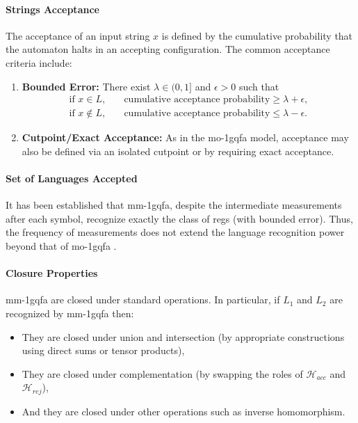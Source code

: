 \paragraph{Strings Acceptance}  
The acceptance of an input string $x$ is defined by the cumulative probability that the automaton halts in an accepting configuration. The common acceptance criteria include:
\begin{enumerate}
  \item \textbf{Bounded Error:} There exist $\lambda\in(0,1]$ and $\epsilon>0$ such that
  \[
  \begin{aligned}
  \text{if } x\in L,&\quad \text{cumulative acceptance probability} \ge \lambda+\epsilon,\\[1mm]
  \text{if } x\notin L,&\quad \text{cumulative acceptance probability} \le \lambda-\epsilon.
  \end{aligned}
  \]
  \item \textbf{Cutpoint/Exact Acceptance:} As in the \gls{mo-1gqfa} model, acceptance may also be defined via an isolated cutpoint or by requiring exact acceptance.
\end{enumerate}

\paragraph{Set of Languages Accepted} 
It has been established that \gls{mm-1gqfa}, despite the intermediate measurements after each symbol, recognize exactly the class of \glspl{reg} (with bounded error). Thus, the frequency of measurements does not extend the language recognition power beyond that of \gls{mo-1gqfa} \cite{li2012characterizations}.

\paragraph{Closure Properties}  
\gls{mm-1gqfa} are closed under standard operations. In particular, if $L_1$ and $L_2$ are recognized by \gls{mm-1gqfa} then:
\begin{itemize}
  \item They are closed under union and intersection (by appropriate constructions using direct sums or tensor products),
  \item They are closed under complementation (by swapping the roles of $\mathcal{H}_{acc}$ and $\mathcal{H}_{rej}$),
  \item And they are closed under other operations such as inverse homomorphism.
\end{itemize}

